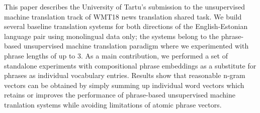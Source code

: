 This paper describes the University of Tartu's submission to the unsupervised machine translation track of WMT18 news translation shared task. We build several baseline translation systems for both directions of the English-Estonian language pair using monolingual data only; the systems belong to the phrase-based unsupervised machine translation paradigm where we experimented with phrase lengths of up to 3. As a main contribution, we performed a set of standalone experiments with compositional phrase embeddings as a substitute for phrases as individual vocabulary entries. Results show that reasonable n-gram vectors  can be obtained by simply summing up individual word vectors which retains or improves the performance of phrase-based unsupervised machine tranlation systems while avoiding limitations of atomic phrase vectors.
